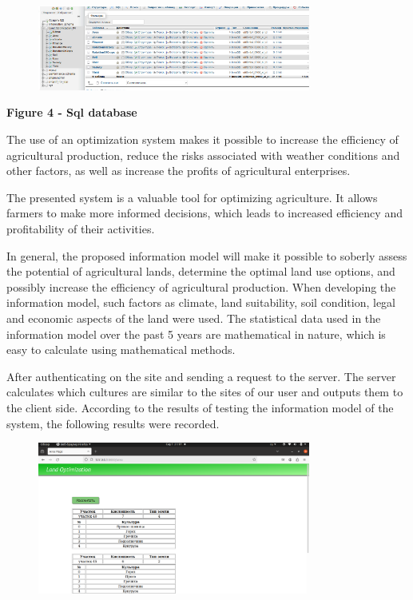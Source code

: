 \begin{figure}[H]
	\centering
	\includegraphics[width=0.8\textwidth]{assets/71}
	\caption*{}
\end{figure}

\textbf{Figure 4 - Sql database}

The use of an optimization system makes it possible to increase the
efficiency of agricultural production, reduce the risks associated with
weather conditions and other factors, as well as increase the profits of
agricultural enterprises.

The presented system is a valuable tool for optimizing agriculture. It
allows farmers to make more informed decisions, which leads to increased
efficiency and profitability of their activities.

In general, the proposed information model will make it possible to
soberly assess the potential of agricultural lands, determine the
optimal land use options, and possibly increase the efficiency of
agricultural production. When developing the information model, such
factors as climate, land suitability, soil condition, legal and economic
aspects of the land were used. The statistical data used in the
information model over the past 5 years are mathematical in nature,
which is easy to calculate using mathematical methods.

After authenticating on the site and sending a request to the server.
The server calculates which cultures are similar to the sites of our
user and outputs them to the client side. According to the results of
testing the information model of the system, the following results were
recorded.

\begin{figure}[H]
	\centering
	\includegraphics[width=0.8\textwidth]{assets/72}
	\caption*{}
\end{figure}

